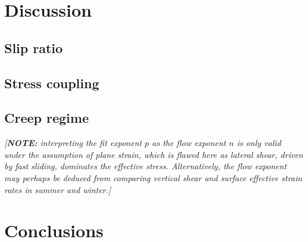 \documentclass[utf8]{article}
\newcommand{\note}[1]{\textcolor{c0}{\emph{[\textbf{NOTE:} #1]}}}
\begin{document}
\section{Discussion}

\subsection{Slip ratio}
\subsection{Stress coupling}
\subsection{Creep regime}

    \note{%
        interpreting the fit exponent $p$ as the flow exponent $n$ is only
        valid under the assumption of plane strain, which is flawed here as
        lateral shear, driven by fast sliding, dominates the effective stress.
        Alternatively, the flow exponent may perhaps be deduced from comparing
        vertical shear and surface effective strain rates in summer and
        winter.}


\section{Conclusions}



\end{document}
